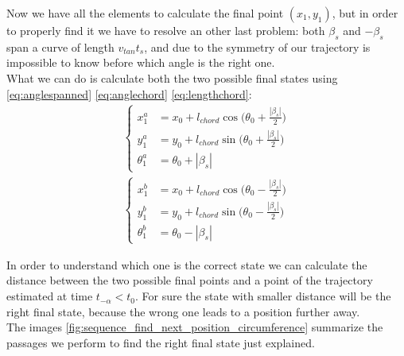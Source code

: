 \begin{itemize}
Now we have all the elements to calculate the final point $(x_1,y_1)$, but in order to properly find it we have to resolve an other last problem: both $\beta_{s}$ and  $-\beta_{s}$ span a curve of length $v_{tan}t_s$, and due to the symmetry of our trajectory is impossible to know before which angle is the right one. \\
What we can do is calculate both the two possible final states using \ref{eq:anglespanned} \ref{eq:anglechord} \ref{eq:lengthchord}:
\begin{align*}
\begin{cases}
x_1^a &= x_0 + l_{chord}\cos{\Big(\theta_0 + \frac{|\beta_s|}{2}\Big) }\\[5pt]
y_1^a &= y_0 + l_{chord}\sin{\Big(\theta_0 + \frac{|\beta_s|}{2} \Big)}\\[5pt]
\theta_1^a &=  \theta_0 + |\beta_s|
\end{cases}
\end{align*}
\begin{align*}
\begin{cases}
x_1^b &= x_0 + l_{chord}\cos{\Big(\theta_0 - \frac{|\beta_s|}{2}\Big) }\\[5pt]
y_1^b &= y_0 + l_{chord}\sin{\Big(\theta_0 - \frac{|\beta_s|}{2}\Big) }\\[5pt]
\theta_1^b &=  \theta_0 - |\beta_s|
\end{cases}
\end{align*}

In order to understand which one is the correct state we can calculate the distance between the two possible final points and a point of the trajectory estimated at time $ t_{-\alpha} < t_0$. For sure the state with smaller distance will be the right final state, because the wrong one leads to a position further away.\\

The images  \ref{fig:sequence_find_next_position_circumference} summarize the passages we perform to find the right final state just explained.


\end{itemize}
